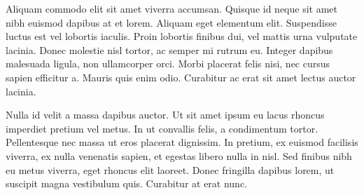 Aliquam commodo elit sit amet viverra accumsan. Quisque id neque sit amet nibh euismod dapibus at et lorem. Aliquam eget elementum elit. Suspendisse luctus est vel lobortis iaculis. Proin lobortis finibus dui, vel mattis urna vulputate lacinia. Donec molestie nisl tortor, ac semper mi rutrum eu. Integer dapibus malesuada ligula, non ullamcorper orci. Morbi placerat felis nisi, nec cursus sapien efficitur a. Mauris quis enim odio. Curabitur ac erat sit amet lectus auctor lacinia.

Nulla id velit a massa dapibus auctor. Ut sit amet ipsum eu lacus rhoncus imperdiet pretium vel metus. In ut convallis felis, a condimentum tortor. Pellentesque nec massa ut eros placerat dignissim. In pretium, ex euismod facilisis viverra, ex nulla venenatis sapien, et egestas libero nulla in nisl. Sed finibus nibh eu metus viverra, eget rhoncus elit laoreet. Donec fringilla dapibus lorem, ut suscipit magna vestibulum quis. Curabitur at erat nunc.